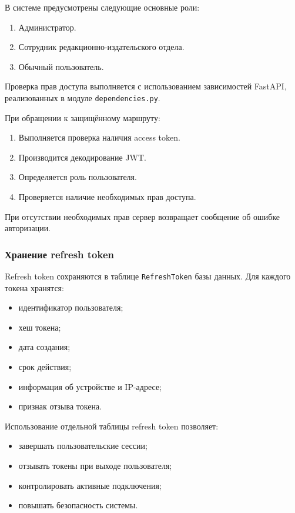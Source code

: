 В системе предусмотрены следующие основные роли:
\begin{enumerate}
	\item Администратор.
	\item Сотрудник редакционно-издательского отдела.
	\item Обычный пользователь.
\end{enumerate}

Проверка прав доступа выполняется с использованием зависимостей FastAPI, реализованных в модуле \texttt{dependencies.py}.

При обращении к защищённому маршруту:
\begin{enumerate}
	\item Выполняется проверка наличия access token.
	\item Производится декодирование JWT.
	\item Определяется роль пользователя.
	\item Проверяется наличие необходимых прав доступа.
\end{enumerate}

При отсутствии необходимых прав сервер возвращает сообщение об ошибке авторизации.

\subsubsection{Хранение refresh token}

Refresh token сохраняются в таблице \texttt{RefreshToken} базы данных. Для каждого токена хранятся:
\begin{itemize}
	\item идентификатор пользователя;
	\item хеш токена;
	\item дата создания;
	\item срок действия;
	\item информация об устройстве и IP-адресе;
	\item признак отзыва токена.
\end{itemize}

Использование отдельной таблицы refresh token позволяет:
\begin{itemize}
	\item завершать пользовательские сессии;
	\item отзывать токены при выходе пользователя;
	\item контролировать активные подключения;
	\item повышать безопасность системы.
\end{itemize}

